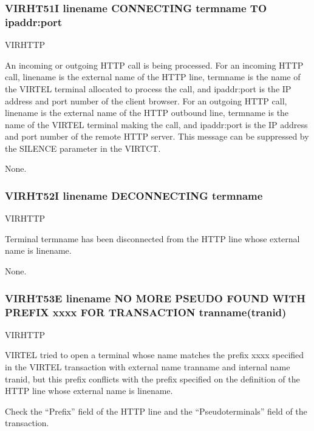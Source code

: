\documentclass[letterpaper,10pt,english]{sphinxmanual}
\begin{document}
\subsubsection{VIRHT51I linename CONNECTING termname TO ipaddr:port}
\label{\detokenize{messages:virht51i-linename-connecting-termname-to-ipaddr-port}}\begin{description}
\sphinxAtStartPar
VIRHTTP

\sphinxAtStartPar
An incoming or outgoing HTTP call is being processed. For an incoming HTTP call, linename is the external name of the HTTP line, termname is the name of the VIRTEL terminal allocated to process the call, and ipaddr:port is the IP address and port number of the client browser. For an outgoing HTTP call, linename is the external name of the HTTP outbound line, termname is the name of the VIRTEL terminal making the call, and ipaddr:port is the IP address and port number of the remote HTTP server. This message can be suppressed by the SILENCE parameter in the VIRTCT.

\sphinxAtStartPar
None.

\end{description}


\subsubsection{VIRHT52I linename DECONNECTING termname}
\label{\detokenize{messages:virht52i-linename-deconnecting-termname}}\begin{description}
\sphinxAtStartPar
VIRHTTP

\sphinxAtStartPar
Terminal termname has been disconnected from the HTTP line whose external name is linename.

\sphinxAtStartPar
None.

\end{description}


\subsubsection{VIRHT53E linename NO MORE PSEUDO FOUND WITH PREFIX xxxx FOR TRANSACTION tranname(tranid)}
\label{\detokenize{messages:virht53e-linename-no-more-pseudo-found-with-prefix-xxxx-for-transaction-tranname-tranid}}\begin{description}
\sphinxAtStartPar
VIRHTTP

\sphinxAtStartPar
VIRTEL tried to open a terminal whose name matches the prefix xxxx specified in the VIRTEL transaction with external name tranname and internal name tranid, but this prefix conflicts with the prefix specified on the definition of the HTTP line whose external name is linename.

\sphinxAtStartPar
Check the “Prefix” field of the HTTP line and the “Pseudo\sphinxhyphen{}terminals” field of the transaction.

\end{description}
\end{document}
